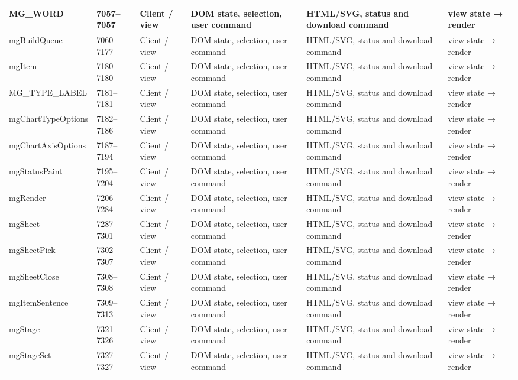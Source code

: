 \begin{landscape}
\begin{longtable}{@{}p{3.2cm}p{1.45cm}p{2.7cm}p{4.0cm}p{4.0cm}p{3.0cm}@{}}
MG\_WORD & 7057--7057 & Client / view & DOM state, selection, user command & HTML/SVG, status and download command & view state → render \\\hline
mgBuildQueue & 7060--7177 & Client / view & DOM state, selection, user command & HTML/SVG, status and download command & view state → render \\\hline
mgItem & 7180--7180 & Client / view & DOM state, selection, user command & HTML/SVG, status and download command & view state → render \\\hline
MG\_TYPE\_LABEL & 7181--7181 & Client / view & DOM state, selection, user command & HTML/SVG, status and download command & view state → render \\\hline
mgChartTypeOptions & 7182--7186 & Client / view & DOM state, selection, user command & HTML/SVG, status and download command & view state → render \\\hline
mgChartAxisOptions & 7187--7194 & Client / view & DOM state, selection, user command & HTML/SVG, status and download command & view state → render \\\hline
mgStatusPaint & 7195--7204 & Client / view & DOM state, selection, user command & HTML/SVG, status and download command & view state → render \\\hline
mgRender & 7206--7284 & Client / view & DOM state, selection, user command & HTML/SVG, status and download command & view state → render \\\hline
mgSheet & 7287--7301 & Client / view & DOM state, selection, user command & HTML/SVG, status and download command & view state → render \\\hline
mgSheetPick & 7302--7307 & Client / view & DOM state, selection, user command & HTML/SVG, status and download command & view state → render \\\hline
mgSheetClose & 7308--7308 & Client / view & DOM state, selection, user command & HTML/SVG, status and download command & view state → render \\\hline
mgItemSentence & 7309--7313 & Client / view & DOM state, selection, user command & HTML/SVG, status and download command & view state → render \\\hline
mgStage & 7321--7326 & Client / view & DOM state, selection, user command & HTML/SVG, status and download command & view state → render \\\hline
mgStageSet & 7327--7327 & Client / view & DOM state, selection, user command & HTML/SVG, status and download command & view state → render \\\hline

\end{longtable}
\end{landscape}
